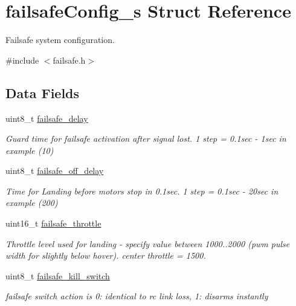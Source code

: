 \hypertarget{structfailsafeConfig__s}{\section{failsafe\+Config\+\_\+s Struct Reference}
\label{structfailsafeConfig__s}
}


Failsafe system configuration.  




{\ttfamily \#include $<$failsafe.\+h$>$}

\subsection*{Data Fields}
\begin{DoxyCompactItemize}
\item 
uint8\+\_\+t \hyperlink{structfailsafeConfig__s_a6a70af0c8e4c935027ed50a204329fa2}{failsafe\+\_\+delay}
\begin{DoxyCompactList}\small\item\em Guard time for failsafe activation after signal lost. 1 step = 0.\+1sec -\/ 1sec in example (10) \end{DoxyCompactList}\item 
uint8\+\_\+t \hyperlink{structfailsafeConfig__s_a7dea3f5b2c7e063f86a7eb854a636f11}{failsafe\+\_\+off\+\_\+delay}
\begin{DoxyCompactList}\small\item\em Time for Landing before motors stop in 0.\+1sec. 1 step = 0.\+1sec -\/ 20sec in example (200) \end{DoxyCompactList}\item 
uint16\+\_\+t \hyperlink{structfailsafeConfig__s_a4b281394340a52b19f9b655c2108ef82}{failsafe\+\_\+throttle}
\begin{DoxyCompactList}\small\item\em Throttle level used for landing -\/ specify value between 1000..2000 (pwm pulse width for slightly below hover). center throttle = 1500. \end{DoxyCompactList}\item 
uint8\+\_\+t \hyperlink{structfailsafeConfig__s_a0e65451c6e1389fca9f8d2797da78866}{failsafe\+\_\+kill\+\_\+switch}
\begin{DoxyCompactList}\small\item\em failsafe switch action is 0\+: identical to rc link loss, 1\+: disarms instantly \end{DoxyCompactList}\item 

\end{DoxyCompactItemize}
